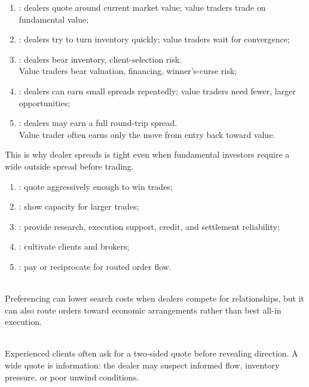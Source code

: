\documentclass[a4paper,oneside,openany]{book}
\begin{document}
\begin{taxonomy} 
\begin{enumerate}[label=\roman*.]
\setlength{\itemsep}{0pt}
\item {}: dealers quote around current market value; value traders trade on fundamental value;
\item {}: dealers try to turn inventory quickly; value traders wait for convergence;
\item {}: dealers bear inventory, client-selection risk.\\
Value traders bear valuation, financing, winner's-curse risk;
\item {}: dealers can earn small spreads repeatedly; value traders need fewer, larger opportunities;
\item {}: dealers may earn a full round-trip spread.\\
Value trader often earns only the move from entry back toward value.
\end{enumerate}
This is why dealer spreads is tight even when fundamental investors require a wide outside spread before trading.
\end{taxonomy}

\begin{taxonomy} 
\begin{enumerate}[label=\roman*.]
\setlength{\itemsep}{0pt}
\item {}: quote aggressively enough to win trades;
\item {}: show capacity for larger trades;
\item {}: provide research, execution support, credit, and settlement reliability;
\item {}: cultivate clients and brokers;
\item {}: pay or reciprocate for routed order flow.
\end{enumerate}
\end{taxonomy}

\begin{caveat} \\
Preferencing can lower search costs when dealers compete for relationships, but it can also route orders toward economic arrangements rather than best all-in execution.
\end{caveat}

\begin{practitionernote} \\
Experienced clients often ask for a two-sided quote before revealing direction. A wide quote is information: the dealer may suspect informed flow, inventory pressure, or poor unwind conditions.
\end{practitionernote}
\end{document}
